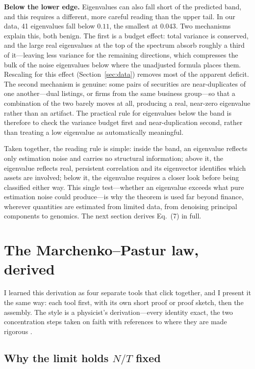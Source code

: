 \documentclass[11pt]{article}
\begin{document}
\textbf{Below the lower edge.} Eigenvalues can also fall short of the predicted band, and this
requires a different, more careful reading than the upper tail. In our data, 41 eigenvalues fall
below $0.11$, the smallest at $0.043$. Two mechanisms explain this, both benign. The first is a
budget effect: total variance is conserved, and the large real eigenvalues at the top of the
spectrum absorb roughly a third of it---leaving less variance for the remaining directions, which
compresses the bulk of the noise eigenvalues below where the unadjusted formula places them.
Rescaling for this effect (Section~\ref{sec:data}) removes most of the apparent deficit. The
second mechanism is genuine: some pairs of securities are near-duplicates of one another---dual
listings, or firms from the same business group---so that a combination of the two barely moves at
all, producing a real, near-zero eigenvalue rather than an artifact. The practical rule for
eigenvalues below the band is therefore to check the variance budget first and near-duplication
second, rather than treating a low eigenvalue as automatically meaningful.

Taken together, the reading rule is simple: inside the band, an eigenvalue reflects only
estimation noise and carries no structural information; above it, the eigenvalue reflects real,
persistent correlation and its eigenvector identifies which assets are involved; below it, the
eigenvalue requires a closer look before being classified either way. This single test---whether
an eigenvalue exceeds what pure estimation noise could produce---is why the theorem is used far
beyond finance, wherever quantities are estimated from limited data, from denoising principal
components to genomics. The next section derives Eq.~(7) in full.

\section{The Marchenko--Pastur law, derived}
\label{sec:derivation}

I learned this derivation as four separate tools that click together, and I
present it the same way: each tool first, with its own short proof or proof
sketch, then the assembly. The style is a physicist's derivation---every
identity exact, the two concentration steps taken on faith with references
to where they are made rigorous \cite{baisilverstein2010}.

\subsection{Why the limit holds $N/T$ fixed}
\label{sec:whygamma}
\end{document}

